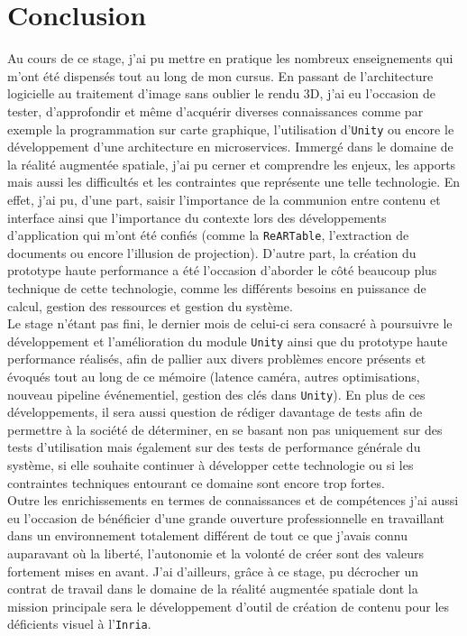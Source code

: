 \chapter{Conclusion}

Au cours de ce stage, j'ai pu mettre en pratique les nombreux enseignements qui m'ont été dispensés tout au long de mon cursus. En passant de l'architecture logicielle au traitement d'image sans oublier le rendu 3D, j'ai eu l'occasion de tester, d'approfondir et même d'acquérir diverses connaissances comme par exemple la programmation sur carte graphique, l'utilisation d'\texttt{Unity} ou encore le développement d'une architecture en microservices. Immergé dans le domaine de la réalité augmentée spatiale, j'ai pu cerner et comprendre les enjeux, les apports mais aussi les difficultés et les contraintes que représente une telle technologie. En effet, j'ai pu, d'une part, saisir l'importance de la communion entre contenu et interface ainsi que l'importance du contexte lors des développements d'application qui m'ont été confiés (comme la \texttt{ReARTable}, l'extraction de documents ou encore l'illusion de projection). D'autre part, la création du prototype haute performance a été l'occasion d'aborder le côté beaucoup plus technique de cette technologie, comme les différents besoins en puissance de calcul, gestion des ressources et gestion du système.\\

Le stage n'étant pas fini, le dernier mois de celui-ci sera consacré à poursuivre le développement et l'amélioration du module \texttt{Unity} ainsi que du prototype haute performance réalisés, afin de pallier aux divers problèmes encore présents et évoqués tout au long de ce mémoire (latence caméra, autres optimisations, nouveau pipeline événementiel, gestion des clés dans \texttt{Unity}). En plus de ces développements, il sera aussi question de rédiger davantage de tests afin de permettre à la société de déterminer, en se basant non pas uniquement sur des tests d'utilisation mais également sur des tests de performance générale du système, si elle souhaite continuer à développer cette technologie ou si les contraintes techniques entourant ce domaine sont encore trop fortes.\\

Outre les enrichissements en termes de connaissances et de compétences j'ai aussi eu l'occasion de bénéficier d'une grande ouverture professionnelle en travaillant dans un environnement totalement différent de tout ce que j'avais connu auparavant où la liberté, l'autonomie et la volonté de créer sont des valeurs fortement mises en avant.
J'ai d'ailleurs, grâce à ce stage, pu décrocher un contrat de travail dans le domaine de la réalité augmentée spatiale dont la mission principale sera le développement d'outil de création de contenu pour les déficients visuel à l'\texttt{Inria}.